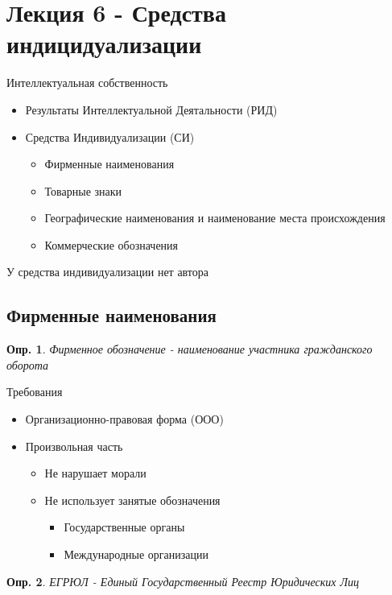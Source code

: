 \documentclass[12pt]{article}
\newtheorem{definition}{Опр.}
\begin{document}
\section{Лекция 6 - Средства индицидуализации}

Интеллектуальная собственность
\begin{itemize}
  \item Результаты Интеллектуальной Деятальности (РИД)
  \item Средства Индивидуализации (СИ) 
  \begin{itemize}
    \item Фирменные наименования
    \item Товарные знаки
    \item Географические наименования и наименование места происхождения
    \item Коммерческие обозначения
  \end{itemize}
\end{itemize}

У средства индивидуализации нет автора

\subsection{Фирменные наименования}

\begin{definition}
  Фирменное обозначение - наименование участника гражданского оборота
\end{definition}
Требования
\begin{itemize}
  \item Организационно-правовая форма (ООО)
  \item Произвольная часть
  \begin{itemize}
  \item Не нарушает морали
  \item Не использует занятые обозначения
  \begin{itemize}
    \item Государственные органы
    \item Международные организации
  \end{itemize}  
\end{itemize}
\end{itemize}

\begin{definition}
  ЕГРЮЛ - Единый Государственный Реестр Юридических Лиц
\end{definition}
\end{document}
